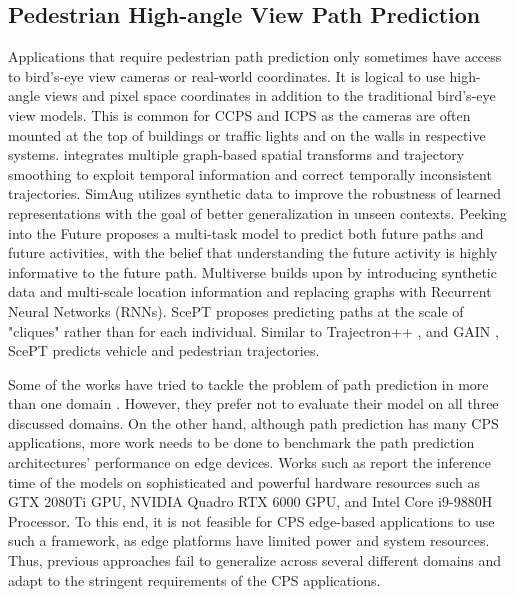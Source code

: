 \documentclass[sigconf]{acmart}
\begin{document}
\subsection{Pedestrian High-angle View Path Prediction}
Applications that require pedestrian path prediction only sometimes have access to bird's-eye view cameras or real-world coordinates. It is logical to use high-angle views and pixel space  coordinates in addition to the traditional bird's-eye view models. This is common for CCPS \cite{Isern2020Reconfig} and ICPS \cite{deniz2022efficient, Chen2021TowardsOH} as the cameras are often mounted at the top of buildings or traffic lights and on the walls in respective systems. \cite{li2022graph} integrates multiple graph-based spatial transforms and trajectory smoothing to exploit temporal information and correct temporally inconsistent trajectories. SimAug \cite{liang2020simaug} utilizes synthetic data to improve the robustness of learned representations with the goal of better generalization in unseen contexts. Peeking into the Future \cite{liang2019peeking} proposes a multi-task model to predict both future paths and future activities, with the belief that understanding the future activity is highly informative to the future path. Multiverse \cite{liang2020garden} builds upon \cite{liang2019peeking} by introducing synthetic data and multi-scale location information and replacing graphs with Recurrent Neural Networks (RNNs). ScePT \cite{chen2022scept} proposes predicting paths at the scale of "cliques" rather than for each individual. Similar to Trajectron++ \cite{salzmann2020trajectron++}, and GAIN \cite{liu2022multi}, ScePT predicts vehicle and pedestrian trajectories. 


Some of the works have tried to tackle the problem of path prediction in more than one domain \cite{liu2022multi, salzmann2020trajectron++, liang2019peeking, zhao2020spatial}. However, they prefer not to evaluate their model on all three discussed domains. On the other hand, although path prediction has many CPS applications, more work needs to be done to benchmark the path prediction architectures' performance on edge devices. Works such as \cite{Chen_2021_ICCV, Shafiee_2021_CVPR, Wang_2021_WACV, peng2021sra} report the inference time of the models on sophisticated and powerful hardware resources such as GTX 2080Ti GPU, NVIDIA Quadro RTX 6000 GPU, and Intel Core i9-9880H Processor. To this end, it is not feasible for CPS edge-based applications to use such a framework, as edge platforms have limited power and system resources. Thus, previous approaches fail to generalize across several different domains and adapt to the stringent requirements of the CPS applications.
\end{document}

